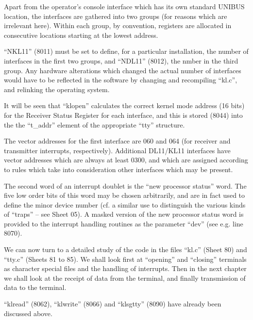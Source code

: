 Apart from the operator's console
interface which has its own standard
UNIBUS location, the interfaces are
gathered into two groups (for reasons
which are irrelevant here). Within
each group, by convention, registers
are allocated in consecutive locations
starting at the lowest address.


``NKL11'' (8011) must be set to define,
for a particular installation, the
number of interfaces in the first two
groups, and ``NDL11'' (8012), the nmber
in the third group. Any hardware
alterations which changed the actual
number of interfaces would have to be
reflected in the software by changing
and recompiling ``kl.c'', and relinking
the operating system.

It will be seen that ``klopen'' calculates the correct kernel mode address
(16 bits) for the Receiver Status
Register for each interface, and this
is stored (8044) into the the ``t\_addr''
element of the appropriate ``tty'' structure.


The vector addresses for the first
interface are 060 and 064 (for receiver
and transmitter interrupts, respectively).
Additional DL11/KL11 interfaces have vector addresses which are
always at least 0300, and which are
assigned according to rules which take
into consideration other interfaces
which may be present.

The second word of an interrupt doublet
is the ``new processor status'' word. The
five low order bits of this word may be
chosen arbitrarily, and are in fact
used to define the minor device number
(cf. a similar use to distinguish the
various kinds of ``traps'' -- see Sheet
05). A masked version of the new processor status word is provided to the
interrupt handling routines as the
parameter ``dev'' (see e.g. line 8070).


We can now turn to a detailed study of
the code in the files ``kl.c'' (Sheet 80)
and ``tty.c'' (Sheets 81 to 85). We
shall look first at ``opening'' and
``closing'' terminals as character
special files and the handling of interrupts. Then in the next chapter we
shall look at the receipt of data from
the terminal, and finally transmission
of data to the terminal.

``klread'' (8062), ``klwrite'' (8066) and
``klsgtty'' (8090) have already been discussed above.


